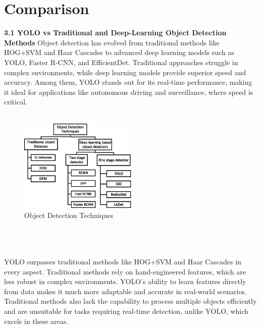 \chapter{Comparison}
%
{\textbf{3.1 YOLO vs Traditional and Deep-Learning Object Detection Methods}}\newline
\newline
%
Object detection has evolved from traditional methods like HOG+SVM and Haar Cascades to advanced deep learning models such as YOLO, Faster R-CNN, and EfficientDet. Traditional approaches struggle in complex environments, while deep learning models provide superior speed and accuracy. Among them, YOLO stands out for its real-time performance, making it ideal for applications like autonomous driving and surveillance, where speed is critical.\\\\
%
\begin{figure}[h!]
    \centering
    \includegraphics[width=0.5\textwidth]{images/Object Detection Techniques.png}
    \caption{Object Detection Techniques}
    \label{fig:enter-label}
\end{figure}
\\\\\\
%
YOLO surpasses traditional methods like HOG+SVM and Haar Cascades in every aspect. Traditional methods rely on hand-engineered features, which are less robust in complex environments. YOLO’s ability to learn features directly from data makes it much more adaptable and accurate in real-world scenarios. Traditional methods also lack the capability to process multiple objects efficiently and are unsuitable for tasks requiring real-time detection, unlike YOLO, which excels in these areas.\\
